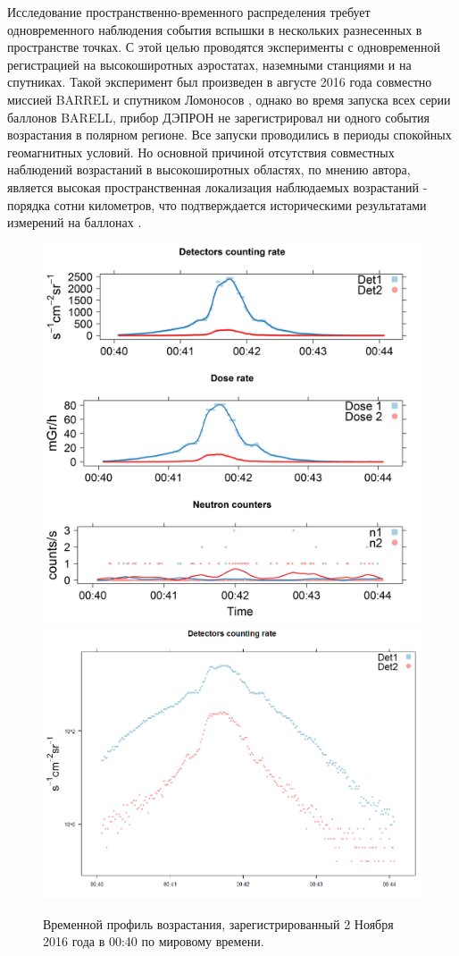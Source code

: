 Исследование пространственно-временного распределения требует одновременного наблюдения события вспышки в нескольких разнесенных в пространстве точках. С этой целью проводятся эксперименты с одновременной регистрацией на высокоширотных аэростатах, наземными станциями и на спутниках. Такой эксперимент был произведен в августе 2016 года совместно миссией BARREL и спутником Ломоносов \cite{Fairbrother2017}, однако во время запуска всех серии баллонов BARELL, прибор ДЭПРОН не зарегистрировал ни одного события возрастания в полярном регионе. Все запуски проводились в периоды спокойных геомагнитных условий. Но основной причиной отсутствия совместных наблюдений возрастаний в высокоширотных областях, по мнению автора, является высокая пространственная локализация наблюдаемых возрастаний - порядка сотни километров, что подтверждается историческими результатами измерений на баллонах \cite{Brown1966}. 
\begin{figure}
	\centering
	\includegraphics[width=0.49\linewidth]{images/Flash/depron_sec_log_new11-02-16}
	\includegraphics[width=0.49\linewidth]{images/Flash/depron_sec_log_new11-02-161}
	\caption{Временной профиль возрастания, зарегистрированный 2 Ноября 2016 года в 00:40 по мировому времени.}
	\label{fig:depronseclognew11-02-16}
\end{figure}





